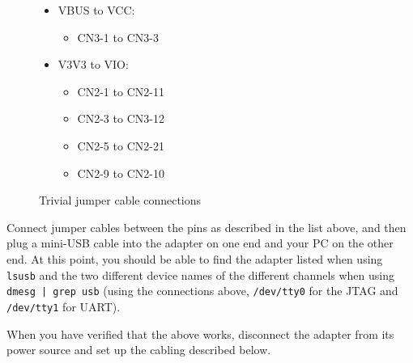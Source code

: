 \documentclass[a4paper,11pt,reqno]{amsart}
\begin{document}
{\begin{figure}[hb]
\begin{center}
\begin{itemize}
\item VBUS to VCC:
		\begin{itemize}
		\item CN3-1 to CN3-3
		\end{itemize}
\item V3V3 to VIO:
		\begin{itemize}
		\item CN2-1 to CN2-11
		\item CN2-3 to CN3-12
		\item CN2-5 to CN2-21
		\item CN2-9 to CN2-10
		\end{itemize}
\end{itemize}
\end{center}
\caption{Trivial jumper cable connections}
\label{fig:con1}
\end{figure}

Connect jumper cables between the pins as described in the list above, and then plug a mini-USB cable into the adapter on one end and your PC on the other end. At this point, you should be able to find the adapter listed when using \texttt{lsusb} and the two different device names of the different channels when using \texttt{dmesg | grep usb} (using the connections above, \texttt{/dev/tty0} for the JTAG and \texttt{/dev/tty1} for UART).

When you have verified that the above works, disconnect the adapter from its power source and set up the cabling described below.

}
\end{document}

